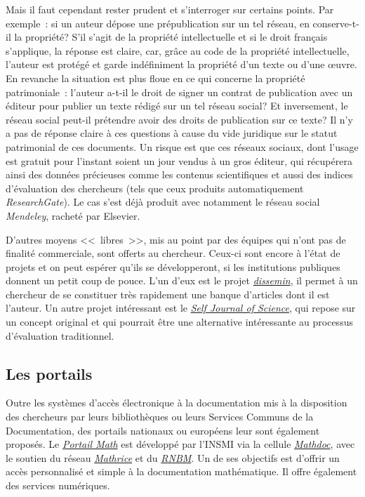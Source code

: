 Mais il faut cependant rester prudent et s'interroger sur certains points. Par exemple~: si un auteur d{\'e}pose une pr{\'e}publication sur un
tel r{\'e}seau, en conserve-t-il la propri{\'e}t{\'e}? S'il s'agit de la propri{\'e}t{\'e} intellectuelle et si le droit fran{\c c}ais s'applique,
la r{\'e}ponse est claire, car, gr{\^a}ce au code de la propri{\'e}t{\'e} intellectuelle, l'auteur est prot{\'e}g{\'e} et garde ind{\'e}finiment
la propri{\'e}t{\'e} d'un texte ou d'une {\oe}uvre.
En revanche la situation est plus floue en ce qui concerne la propri{\'e}t{\'e} patrimoniale~: l'auteur a-t-il le droit de signer un contrat de
publication avec un {\'e}diteur pour publier un texte r{\'e}dig{\'e} sur un tel r{\'e}seau social? Et inversement, le r{\'e}seau social peut-il
pr{\'e}tendre avoir des droits de publication sur ce texte? Il n'y a pas de r{\'e}ponse claire {\`a} ces questions {\`a} cause du vide juridique
sur le statut patrimonial de ces documents. Un risque est que ces r{\'e}seaux sociaux, dont l'usage est gratuit pour l'instant soient un jour
vendus {\`a} un gros {\'e}diteur, qui r{\'e}cup{\'e}rera ainsi des donn{\'e}es pr{\'e}cieuses comme les contenus scientifiques et aussi des
indices d'{\'e}valuation des chercheurs (tels que ceux produits automatiquement \emph{ResearchGate}). Le cas s'est d{\'e}j{\`a} produit avec notamment
le r{\'e}seau social \emph{Mendeley}, rachet{\'e} par Elsevier. 

D'autres moyens <<~libres~>>, mis au point par des {\'e}quipes qui n'ont pas de finalit{\'e} commerciale, sont offerts au chercheur. Ceux-ci sont
encore {\`a} l'{\'e}tat de projets et on peut esp{\'e}rer qu'ils se d{\'e}velopperont, si les institutions publiques donnent un petit coup de pouce.
L'un d'eux est le projet  \href{http://dissem.in/}{\emph{dissemin}}, il permet {\`a} un chercheur de se constituer tr{\`e}s rapidement une banque
d'articles dont il est l'auteur. Un autre projet int{\'e}ressant est le  \href{http://sjscience.org/}{\emph{Self Journal of Science}}, qui repose
sur un concept original et qui pourrait {\^e}tre une alternative int{\'e}ressante au processus d'{\'e}valuation traditionnel.

\subsection{Les portails}
Outre les syst{\`e}mes d'acc{\`e}s {\'e}lectronique {\`a} la documentation mis {\`a} la disposition des chercheurs
par leurs biblioth{\`e}ques ou leurs Services Communs de la Documentation, des portails nationaux ou europ{\'e}ens leur sont {\'e}galement propos{\'e}s.
Le \href{https://portail.math.cnrs.fr/}{\emph{Portail Math}} est d{\'e}velopp{\'e} par l'INSMI via la cellule \href{http://www.mathdoc.fr/}{\emph{Mathdoc}},
avec le soutien du r{\'e}seau \href{https://www.mathrice.fr/}{\emph{Mathrice}} et du \href{http://www.rnbm.org/}{\emph{RNBM}}.
Un de ses objectifs est d'offrir un acc{\`e}s personnalis{\'e} et simple {\`a} la documentation math{\'e}matique.
Il offre {\'e}galement des services num{\'e}riques.

